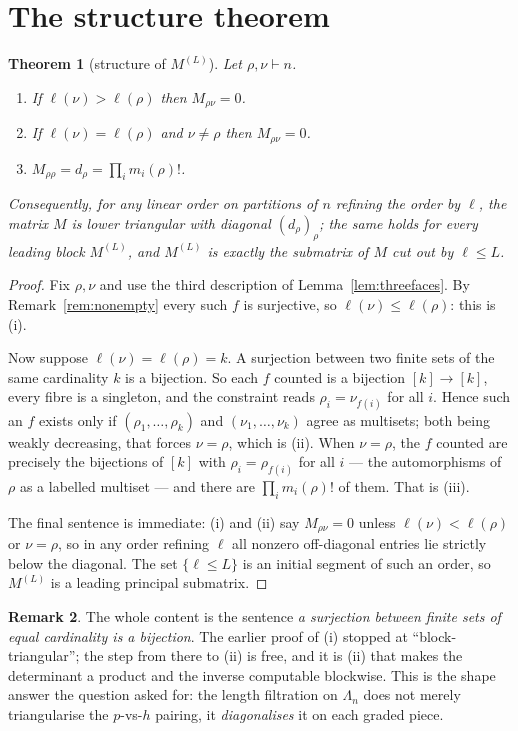 \documentclass[11pt]{article}
\newtheorem{theorem}{Theorem}
\theoremstyle{definition}
\newtheorem{remark}[theorem]{Remark}
\newcommand{\Lam}{\Lambda}
\begin{document}
\section{The structure theorem}

\begin{theorem}[structure of $M^{(L)}$]\label{thm:structure}
Let $\rho,\nu\vdash n$.
\begin{enumerate}
\item[(i)] If $\ell(\nu)>\ell(\rho)$ then $M_{\rho\nu}=0$.
\item[(ii)] If $\ell(\nu)=\ell(\rho)$ and $\nu\ne\rho$ then $M_{\rho\nu}=0$.
\item[(iii)] $M_{\rho\rho}=d_\rho=\prod_i m_i(\rho)!$.
\end{enumerate}
Consequently, for any linear order on partitions of $n$ refining the order by $\ell$, the matrix $M$
is lower triangular with diagonal $(d_\rho)_\rho$; the same holds for every leading block $M^{(L)}$,
and $M^{(L)}$ is exactly the submatrix of $M$ cut out by $\ell\le L$.
\end{theorem}

\begin{proof}
Fix $\rho,\nu$ and use the third description of Lemma~\ref{lem:threefaces}. By
Remark~\ref{rem:nonempty} every such $f$ is surjective, so $\ell(\nu)\le\ell(\rho)$: this is (i).

Now suppose $\ell(\nu)=\ell(\rho)=k$. A surjection between two finite sets of the same cardinality
$k$ is a bijection. So each $f$ counted is a bijection $[k]\to[k]$, every fibre is a singleton, and
the constraint reads $\rho_i=\nu_{f(i)}$ for all $i$. Hence such an $f$ exists only if
$(\rho_1,\dots,\rho_k)$ and $(\nu_1,\dots,\nu_k)$ agree as multisets; both being weakly decreasing,
that forces $\nu=\rho$, which is (ii). When $\nu=\rho$, the $f$ counted are precisely the bijections
of $[k]$ with $\rho_{i}=\rho_{f(i)}$ for all $i$ --- the automorphisms of $\rho$ as a labelled
multiset --- and there are $\prod_i m_i(\rho)!$ of them. That is (iii).

The final sentence is immediate: (i) and (ii) say $M_{\rho\nu}=0$ unless $\ell(\nu)<\ell(\rho)$ or
$\nu=\rho$, so in any order refining $\ell$ all nonzero off-diagonal entries lie strictly below the
diagonal. The set $\{\ell\le L\}$ is an initial segment of such an order, so $M^{(L)}$ is a leading
principal submatrix.
\end{proof}

\begin{remark}
The whole content is the sentence \emph{a surjection between finite sets of equal cardinality is a
bijection}. The earlier proof of (i) stopped at ``block-triangular''; the step from there to (ii) is
free, and it is (ii) that makes the determinant a product and the inverse computable blockwise. This
is the shape answer the question asked for: the length filtration on $\Lam_n$ does not merely
triangularise the $p$-vs-$h$ pairing, it \emph{diagonalises} it on each graded piece.
\end{remark}
\end{document}
